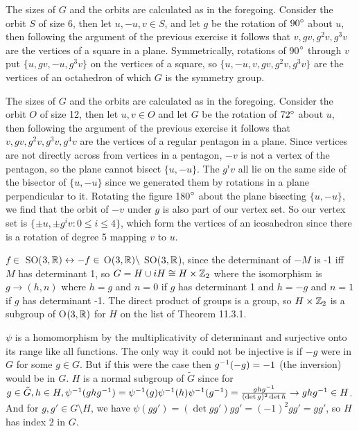 \documentclass[11pt, oneside]{article}   	%
\begin{document}
\item The sizes of $G$ and the orbits are calculated as in the foregoing. Consider the orbit $S$ of size 6, then let $u, -u, v \in S$, and let $g$ be the rotation of $90^\circ$ about $u$, then following the argument of the previous exercise it follows that $v, gv, g^2v, g^3v$ are the vertices of a square in a plane. Symmetrically, rotations of 90$^\circ$ through $v$ put $\{u, gv, -u, g^3v\}$ on the vertices of a square, so $\{u, -u, v, gv, g^2v, g^3v\}$ are the vertices of an octahedron of which $G$ is the symmetry group.
\item The sizes of $G$ and the orbits are calculated as in the foregoing. Consider the orbit $O$ of size 12, then let $u, v \in O$ and let $G$ be the rotation of $72^\circ$ about $u$, then following the argument of the previous exercise it follows that $v, gv, g^2v, g^3v, g^4v$ are the vertices of a regular pentagon in a plane. Since vertices are not directly across from vertices in a pentagon, $-v$ is not a vertex of the pentagon, so the plane cannot bisect $\{u, -u\}$. The $g^iv$ all lie on the same side of the bisector of $\{u, -u\}$ since we generated them by rotations in a plane perpendicular to it. Rotating the figure 180$^\circ$ about the plane bisecting $\{u, -u\}$, we find that the orbit of $-v$ under $g$ is also part of our vertex set. So our vertex set is $\{\pm u, \pm g^iv: 0 \le i \le 4\}$, which form the vertices of an icosahedron since there is a rotation of degree 5 mapping $v$ to $u$. 
\item $f \in$ SO($3, \mathbb{R})\leftrightarrow -f \in$ O($3, \mathbb{R}) \setminus$ SO($3, \mathbb{R}$), since the determinant of $-M$ is -1 iff $M$ has determinant 1, so $G = H \cup iH \cong H \times \mathbb{Z}_2$ where the isomorphism is $g \to (h, n)$ where $h = g$ and $n = 0$ if $g$ has determinant 1 and $h=-g$ and $n=1$ if $g$ has determinant -1. The direct product of groups is a group, so $H \times \mathbb{Z}_2$ is a subgroup of O$(3, \mathbb{R})$ for $H$ on the list of Theorem 11.3.1.
\item \be
\item $\psi$ is a homomorphism by the multiplicativity of determinant and surjective onto its range like all functions. The only way it could not be injective is if $-g$ were in $G$ for some $g \in G$. But if this were the case then $g^{-1} (-g) = -1$ (the inversion) would be in $G$. $H$ is a normal subgroup of $\tilde{G}$ since for $g \in \tilde{G}, h \in H, \psi^{-1}(ghg^{-1}) = \psi^{-1}(g)\psi^{-1}(h)\psi^{-1}(g^{-1}) = \frac{ghg^{-1}}{(\det{g})^2\det{h}} \rightarrow ghg^{-1} \in H$. And for $g, g' \in G \setminus H$, we have $\psi(gg') =( \det{gg'})gg' = (-1)^2gg' = gg'$, so $H$ has index 2 in $G$. 
\end{document}

